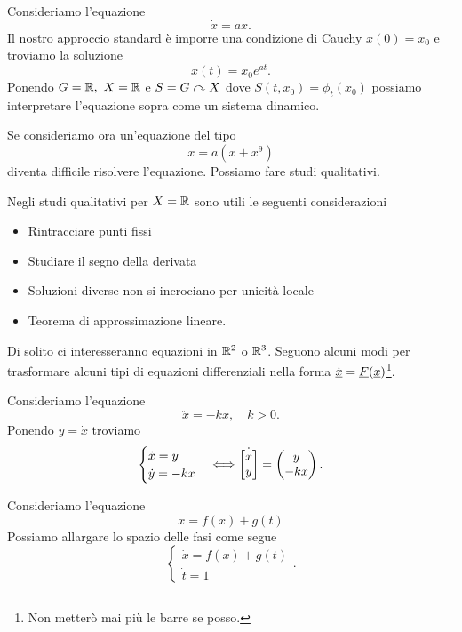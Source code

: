 \begin{example}
Consideriamo l'equazione
\[\dot x=ax.\]
Il nostro approccio standard \`e imporre una condizione di Cauchy $x(0)=x_0$ e troviamo la soluzione
\[x(t)=x_0e^{at}.\]
Ponendo $G=\mathbb{R},\ X=\mathbb{R}$ e $S=G\curvearrowright X$ dove $S(t,x_0)=\phi_t(x_0)$ possiamo interpretare l'equazione sopra come un sistema dinamico.

\noindent
Se consideriamo ora un'equazione del tipo
\[\dot x=a(x+x^9)\]
diventa difficile risolvere l'equazione. Possiamo fare studi qualitativi.

\noindent Negli studi qualitativi per $X=\mathbb{R}$ sono utili le seguenti considerazioni
\begin{itemize}
\item Rintracciare punti fissi
\item Studiare il segno della derivata
\item Soluzioni diverse non si incrociano per unicit\`a locale
\item Teorema di approssimazione lineare.
\end{itemize}
\end{example}

\noindent Di solito ci interesseranno equazioni in $\mathbb{R}^2$ o $\mathbb{R}^3$. Seguono alcuni modi per trasformare alcuni tipi di equazioni differenziali nella forma $\dot {{\underline{x}}}=\underline{F}({\underline{x}})$\footnote{Non metter\`o mai pi\`u le barre se posso.}.
\begin{example}
Consideriamo l'equazione
\[\ddot x=-kx,\quad k>0.\]
Ponendo $y=\dot x$ troviamo
\[\begin{cases}
\dot x=y\\
\dot y=-kx
\end{cases}\Longleftrightarrow \dot{\left[{\begin{matrix}x\\y\end{matrix}}\right]}=\begin{pmatrix}y\\-kx\end{pmatrix}.\]
\end{example}

\begin{example}
Consideriamo l'equazione
\[\dot x=f(x)+g(t)\]
Possiamo allargare lo spazio delle fasi come segue
\[\begin{cases}
\dot x=f(x)+g(t)\\
\dot t=1
\end{cases}.\]
\end{example}


